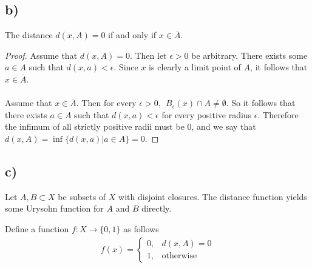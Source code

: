 \documentclass{article}
\theoremstyle{definition}
\begin{document}
    \subsection*{b)}
        \begin{mdframed}
            The distance $d(x,A) = 0$ if and only if $x \in \overline{A}$.
        \end{mdframed}
        \begin{proof}
            \fbox{$\Rightarrow$} Assume that $d(x,A) = 0$. Then let $\epsilon > 0$ be arbitrary.
            There exists some $a \in A$ such that $d(x,a) < \epsilon$. Since $x$ is clearly a limit
            point of $A$, it follows that $x \in \overline{A}$.\\\\
            \fbox{$\Leftarrow$} Assume that $x \in \overline{A}$. Then for every $\epsilon > 0, \ \ 
            B_\epsilon(x) \cap A \neq \emptyset$. So it follows that there exists $a \in A$ such that 
            $d(x,a) < \epsilon$ for every positive radius $\epsilon$. Therefore the infimum of all strictly
            positive radii must be 0, and we say that $d(x,A) = \inf\{d(x,a) | a \in A\} = 0$.
        \end{proof}
    \subsection*{c)}
        \begin{mdframed}
            Let $A,B \subset X$ be subsets of $X$ with disjoint closures. The distance function yields 
            some Urysohn function for $A$ and $B$ directly.
        \end{mdframed}
        Define a function $f: X \rightarrow \{0,1\}$ as follows 
        \begin{align}
            f(x) =
            \begin{cases}
                0, & d(x,A) = 0\\
                1, & \text{otherwise}
            \end{cases}
        \end{align}
\end{document}
